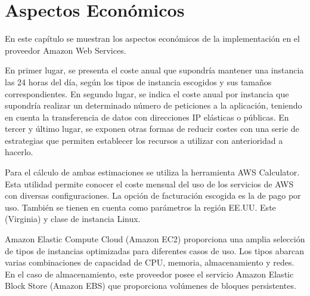 \chapter{Aspectos Económicos}
\label{cha:economic}

En este capítulo se muestran los aspectos económicos de la implementación en el proveedor Amazon Web Services. 

En primer lugar, se presenta el coste anual que supondría mantener una instancia las 24 horas del día, según los tipos de instancia escogidos y sus tamaños correspondientes. En segundo lugar, se indica el coste anual por instancia que supondría realizar un determinado número de peticiones a la aplicación, teniendo en cuenta la transferencia de datos con direcciones IP elásticas o públicas. En tercer y último lugar, se exponen otras formas de reducir costes con una serie de estrategias que permiten establecer los recursos a utilizar con anterioridad a hacerlo.

Para el cálculo de ambas estimaciones se utiliza la herramienta AWS Calculator\cite{AWS Calculator}. Esta utilidad permite conocer el coste mensual del uso de los servicios de AWS con diversas configuraciones. La opción de facturación escogida es la de pago por uso. También se tienen en cuenta como parámetros la región EE.UU. Este (Virginia) y clase de instancia Linux.

Amazon Elastic Compute Cloud (Amazon EC2) proporciona una amplia selección de tipos de instancias optimizadas para diferentes casos de uso. Los tipos abarcan varias combinaciones de capacidad de CPU, memoria, almacenamiento y redes. En el caso de almacenamiento, este proveedor posee el servicio Amazon Elastic Block Store (Amazon EBS)\cite{AWS EBS} que proporciona volúmenes de bloques persistentes.

